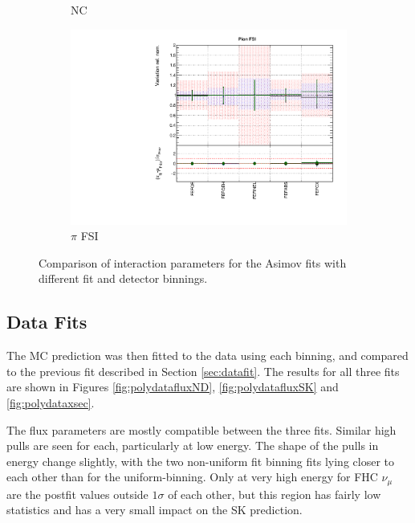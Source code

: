 \begin{figure}[!htbp]
\begin{subfigure}{0.49\textwidth}
  \caption{NC}
\end{subfigure}
\begin{subfigure}{0.49\textwidth}
  \centering
  \includegraphics[width=0.9\linewidth]{figs/polyasmvsxsec_5}
  \caption{$\pi$ FSI}
\end{subfigure}
\caption{Comparison of interaction parameters for the Asimov fits with different fit and detector binnings.}
\label{fig:polyasmvsxsec}
\end{figure}

\subsection{Data Fits}

The MC prediction was then fitted to the data using each binning, and compared to the previous fit described in Section \ref{sec:datafit}. The results for all three fits are shown in Figures \ref{fig:polydatafluxND}, \ref{fig:polydatafluxSK} and \ref{fig:polydataxsec}. 

The flux parameters are mostly compatible between the three fits. Similar high pulls are seen for each, particularly at low energy. The shape of the pulls in energy change slightly, with the two non-uniform fit binning fits lying closer to each other than for the uniform-binning. Only at very high energy for FHC $\nu_{\mu}$ are the postfit values outside $1\sigma$ of each other, but this region has fairly low statistics and has a very small impact on the SK prediction.

